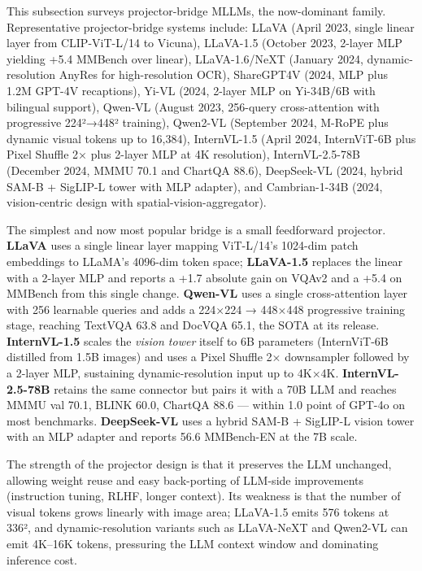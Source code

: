 \documentclass{article}
\begin{document}
This subsection surveys projector-bridge MLLMs, the now-dominant family. Representative projector-bridge systems include: LLaVA (April 2023, single linear layer from CLIP-ViT-L/14 to Vicuna), LLaVA-1.5 (October 2023, 2-layer MLP yielding +5.4 MMBench over linear), LLaVA-1.6/NeXT (January 2024, dynamic-resolution AnyRes for high-resolution OCR), ShareGPT4V (2024, MLP plus 1.2M GPT-4V recaptions), Yi-VL (2024, 2-layer MLP on Yi-34B/6B with bilingual support), Qwen-VL (August 2023, 256-query cross-attention with progressive 224²→448² training), Qwen2-VL (September 2024, M-RoPE plus dynamic visual tokens up to 16,384), InternVL-1.5 (April 2024, InternViT-6B plus Pixel Shuffle 2× plus 2-layer MLP at 4K resolution), InternVL-2.5-78B (December 2024, MMMU 70.1 and ChartQA 88.6), DeepSeek-VL (2024, hybrid SAM-B + SigLIP-L tower with MLP adapter), and Cambrian-1-34B (2024, vision-centric design with spatial-vision-aggregator).

The simplest and now most popular bridge is a small feedforward projector. \textbf{LLaVA} uses a single linear layer mapping ViT-L/14's 1024-dim patch embeddings to LLaMA's 4096-dim token space; \textbf{LLaVA-1.5} \citep{liu2024improvedbaselinesw} replaces the linear with a 2-layer MLP and reports a +1.7 absolute gain on VQAv2 and a +5.4 on MMBench from this single change. \textbf{Qwen-VL} \citep{bai20232023} uses a single cross-attention layer with 256 learnable queries and adds a 224×224 → 448×448 progressive training stage, reaching TextVQA 63.8 and DocVQA 65.1, the SOTA at its release. \textbf{InternVL-1.5} scales the \emph{vision tower} itself to 6B parameters (InternViT-6B distilled from 1.5B images) and uses a Pixel Shuffle 2× downsampler followed by a 2-layer MLP, sustaining dynamic-resolution input up to 4K×4K. \textbf{InternVL-2.5-78B} retains the same connector but pairs it with a 70B LLM and reaches MMMU val 70.1, BLINK 60.0, ChartQA 88.6 --- within 1.0 point of GPT-4o on most benchmarks. \textbf{DeepSeek-VL} uses a hybrid SAM-B + SigLIP-L vision tower with an MLP adapter and reports 56.6 MMBench-EN at the 7B scale.

The strength of the projector design is that it preserves the LLM unchanged, allowing weight reuse and easy back-porting of LLM-side improvements (instruction tuning, RLHF, longer context). Its weakness is that the number of visual tokens grows linearly with image area; LLaVA-1.5 emits 576 tokens at 336², and dynamic-resolution variants such as LLaVA-NeXT and Qwen2-VL can emit 4K--16K tokens, pressuring the LLM context window and dominating inference cost.
\end{document}
